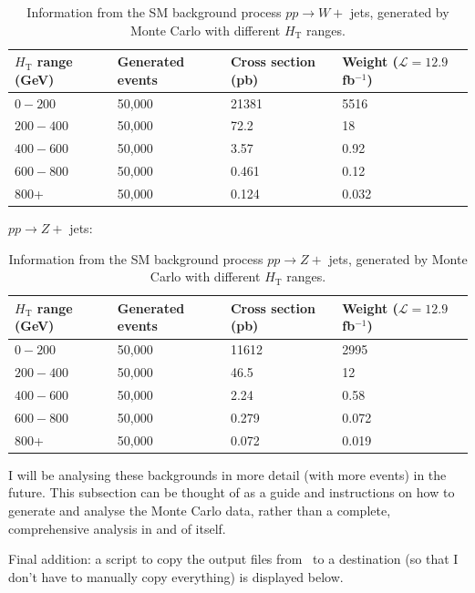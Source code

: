 \begin{table}[H]
\centering
    \begin{tabular}{|l|l|l|l|}
    \hline
    $H_{\mathrm{T}}$ range (GeV) & Generated events & Cross section (pb) & Weight ($\mathcal{L} = 12.9$ fb$^{-1}$) \\ \hline
    $0-200$    & 50,000           & 21381              & 5516                     \\
    $200-400$  & 50,000           & 72.2               & 18                       \\
    $400-600$ & 50,000           & 3.57               & 0.92                     \\
    $600-800$  & 50,000           & 0.461              & 0.12                     \\
    800+     & 50,000           & 0.124              & 0.032                    \\ \hline
    \end{tabular}
\caption{Information from the SM background process $pp \rightarrow W +$ jets, generated by Monte Carlo with different $H_{\mathrm{T}}$ ranges.}
\end{table}

$pp \rightarrow Z +$ jets:

\begin{table}[H]
\centering
    \begin{tabular}{|l|l|l|l|}
    \hline
    $H_{\mathrm{T}}$ range (GeV) & Generated events & Cross section (pb) & Weight ($\mathcal{L} = 12.9$ fb$^{-1}$) \\ \hline
    $0-200$    & 50,000           & 11612              & 2995                     \\
    $200-400$  & 50,000           & 46.5               & 12                       \\
    $400-600$ & 50,000           & 2.24               & 0.58                     \\
    $600-800$  & 50,000           & 0.279              & 0.072                    \\
    800+     & 50,000           & 0.072              & 0.019                    \\ \hline
    \end{tabular}
\caption{Information from the SM background process $pp \rightarrow Z +$ jets, generated by Monte Carlo with different $H_{\mathrm{T}}$ ranges.}
\end{table}

I will be analysing these backgrounds in more detail (with more events) in the future. This subsection can be thought of as a guide and instructions on how to generate and analyse the Monte Carlo data, rather than a complete, comprehensive analysis in and of itself.

Final addition: a script to copy the output files from \madgraph\ to a destination (so that I don't have to manually copy everything) is displayed below.


